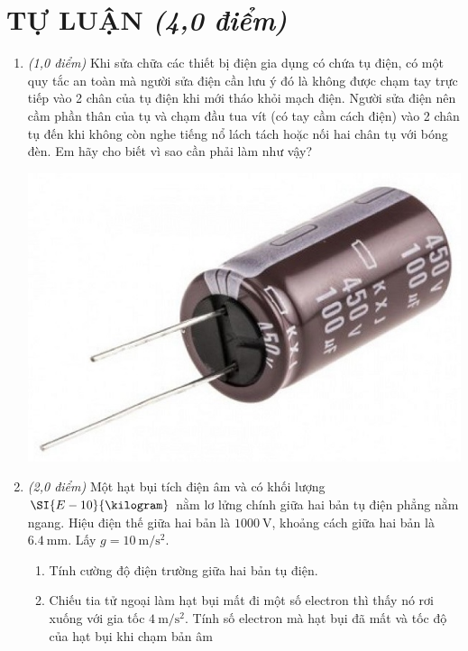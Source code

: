 \section{TỰ LUẬN \textit{(4,0 điểm)}}
\begin{enumerate}[label=\bfseries Câu \arabic*:]
	\item \textit{(1,0 điểm)} Khi sửa chữa các thiết bị điện gia dụng có chứa tụ điện, có một quy tắc an toàn mà người sửa điện cần lưu ý đó là không được chạm tay trực tiếp vào 2 chân của tụ điện khi mới tháo khỏi mạch điện. Người sửa điện nên cầm phần thân của tụ và chạm đầu tua vít (có tay cầm cách điện) vào 2 chân tụ đến khi không còn nghe tiếng nổ lách tách hoặc nối hai chân tụ với bóng đèn. Em hãy cho biết vì sao cần phải làm như vậy?
	\begin{center}
		\includegraphics[width=0.25\linewidth]{../figs/PH11-MidSem2-04-1}
	\end{center}

\item \textit{(2,0 điểm)} Một hạt bụi tích điện âm và có khối lượng $\SI{E-10}{\kilogram}$ nằm lơ lửng chính giữa hai bản tụ điện phẳng nằm ngang. Hiệu điện thế giữa hai bản là $\SI{1000}{\volt}$, khoảng cách giữa hai bản là $\SI{6.4}{\milli\meter}$. Lấy $g=\SI{10}{\meter/\second^2}$.
\begin{enumerate}[label=\alph*)]
	\item Tính cường độ điện trường giữa hai bản tụ điện.
	\item Chiếu tia tử ngoại làm hạt bụi mất đi một số electron thì thấy nó rơi xuống với gia tốc $\SI{4}{\meter/\second^2}$. Tính số electron mà hạt bụi đã mất và tốc độ của hạt bụi khi chạm bản âm
\end{enumerate}


\end{enumerate}
